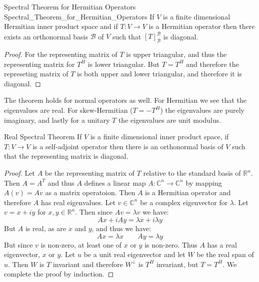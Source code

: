 \documentclass[crop=false,class=article]{standalone}                           %
\begin{document}
        \begin{ftheorem}{Spectral Theorem for Hermitian Operators}
                        {Spectral_Theorem_for_Hermitian_Operators}
            If $V$ is a finite dimensional Hermitian inner product space and if
            $T:V\rightarrow{V}$ is a Hermitian operator then there exists an
            orthonormal basis $\mathscr{B}$ of $V$ such that
            $[T]_{\mathscr{B}}^{\mathscr{B}}$ is diagonal.
        \end{ftheorem}
        \begin{proof}
            For the representing matrix of $T$ is upper triangular, and thus the
            representing matrix for $T^{H}$ is lower triangular. But $T=T^{H}$
            and therefore the represeting matrix of $T$ is both upper and lower
            triangular, and therefore it is diagonal.
        \end{proof}
        The theorem holds for normal operators as well. For Hermitian we see
        that the eigenvalues are real. For skew-Hermitian ($T=\minus{T}^{H}$)
        the eigenvalues are purely imaginary, and lastly for a unitary $T$ the
        eigenvalues are unit modulus.
        \begin{ftheorem}{Real Spectral Theorem}
            If $V$ is a finite dimensional inner product space, if
            $T:V\rightarrow{V}$ is a self-adjoint operator then there is an
            orthonormal basis of $V$ such that the representing matrix is
            diagonal.
        \end{ftheorem}
        \begin{proof}
            Let $A$ be the representing matrix of $T$ relative to the standard
            basis of $\mathbb{R}^{n}$. Then $A=A^{T}$ and thus $A$ defines a
            linear map $A:\mathbb{C}^{n}\rightarrow\mathbb{C}^{n}$ by mapping
            $A(v)=Av$ as a matrix operatoion. Then $A$ is a Hermitian operator
            and therefore $A$ has real eigenvalues. Let $v\in\mathbb{C}^{n}$ be
            a complex eigenvector for $\lambda$. Let $v=x+iy$ for
            $x,y\in\mathbb{R}^{n}$. Then since $Av=\lambda{v}$ we have:
            \begin{equation}
                Ax+iAy=\lambda{x}+i\lambda{y}
            \end{equation}
            But $A$ is real, as are $x$ and $y$, and thus we have:
            \begin{equation}
                Ax=\lambda{x}
                \quad\quad
                Ay=\lambda{y}
            \end{equation}
            But since $v$ is non-zero, at least one of $x$ or $y$ is non-zero.
            Thus $A$ has a real eigenvector, $x$ or $y$. Let $u$ be a unit
            real eigenvector and let $W$ be the real span of $u$. Then $W$ is
            $T$ invariant and therefore $W^{\perp}$ is $T^{H}$ invariant, but
            $T=T^{H}$. We complete the proof by induction.
        \end{proof}
\end{document}
